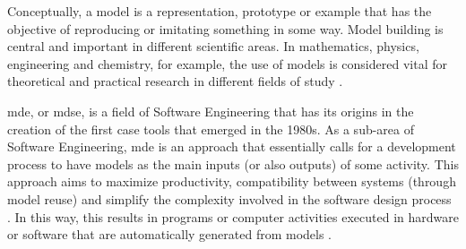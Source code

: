 Conceptually, a model is a representation, prototype or example that has the objective of reproducing or imitating something in some way.
Model building is central and important in different scientific areas.
In mathematics, physics, engineering and chemistry, for example, the use of models is considered vital for theoretical and practical research in different fields of study \cite{Bailer:2009}.

\ac{mde}, or \ac{mdse}, is a field of Software Engineering that has its origins in the creation of the first \ac{case} tools that emerged in the 1980s.
As a sub-area of Software Engineering, \ac{mde} is an approach that essentially calls for a development process to have models as the main inputs (or also outputs) of some activity.
This approach aims to maximize productivity, compatibility between systems (through model reuse) and simplify the complexity involved in the software design process  \cite{Brambilla:2017}.
In this way, this results in programs or computer activities executed in hardware or software that are automatically generated from models \cite{Sommerville:2015}.


